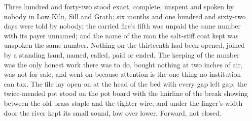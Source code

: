 Three hundred and forty-two stood exact, complete, unspent and spoken by nobody in Low Kiln, Sill and Grath; six months and one hundred and sixty-two days were told by nobody; the carried fire's fifth was unpaid the same number with its payer unnamed; and the name of the man the salt-stiff coat kept was unspoken the same number. Nothing on the thirteenth had been opened, joined by a standing hand, named, called, paid or ended. The keeping of the number was the only honest work there was to do, bought nothing at two inches of air, was not for sale, and went on because attention is the one thing no institution can tax. The file lay open on  at the head of the bed with every gap left gap; the twice-mended pot stood on the pot board with the hairline of the break showing between the old-brass staple and the tighter wire; and under the finger's-width door the river kept its small sound, low over lower. Forward, not closed.
